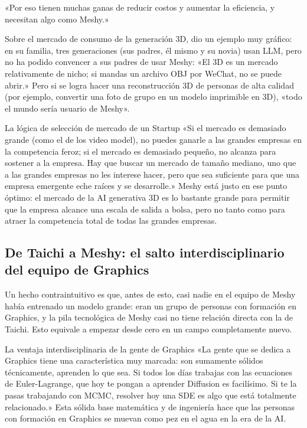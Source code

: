 «Por eso tienen muchas ganas de reducir costos y aumentar la eficiencia, y necesitan algo como Meshy.»

Sobre el mercado de consumo de la generación 3D, dio un ejemplo muy gráfico: en su familia, tres generaciones (sus padres, él mismo y su novia) usan LLM, pero no ha podido convencer a sus padres de usar Meshy: «El 3D es un mercado relativamente de nicho; si mandas un archivo OBJ por WeChat, no se puede abrir.» Pero si se logra hacer una reconstrucción 3D de personas de alta calidad (por ejemplo, convertir una foto de grupo en un modelo imprimible en 3D), «todo el mundo sería usuario de Meshy».

\begin{knowledgebox}{La lógica de selección de mercado de un Startup}
«Si el mercado es demasiado grande (como el de los video model), no puedes ganarle a las grandes empresas en la competencia feroz; si el mercado es demasiado pequeño, no alcanza para sostener a la empresa. Hay que buscar un mercado de tamaño mediano, uno que a las grandes empresas no les interese hacer, pero que sea suficiente para que una empresa emergente eche raíces y se desarrolle.» Meshy está justo en ese punto óptimo: el mercado de la AI generativa 3D es lo bastante grande para permitir que la empresa alcance una escala de salida a bolsa, pero no tanto como para atraer la competencia total de todas las grandes empresas.
\end{knowledgebox}

\subsection{De Taichi a Meshy: el salto interdisciplinario del equipo de Graphics}

Un hecho contraintuitivo es que, antes de esto, casi nadie en el equipo de Meshy había entrenado un modelo grande: eran un grupo de personas con formación en Graphics, y la pila tecnológica de Meshy casi no tiene relación directa con la de Taichi. Esto equivale a empezar desde cero en un campo completamente nuevo.

\begin{knowledgebox}{La ventaja interdisciplinaria de la gente de Graphics}
«La gente que se dedica a Graphics tiene una característica muy marcada: son sumamente sólidos técnicamente, aprenden lo que sea. Si todos los días trabajas con las ecuaciones de Euler-Lagrange, que hoy te pongan a aprender Diffusion es facilísimo. Si te la pasas trabajando con MCMC, resolver hoy una SDE es algo que está totalmente relacionado.» Esta sólida base matemática y de ingeniería hace que las personas con formación en Graphics se muevan como pez en el agua en la era de la AI.
\end{knowledgebox}

